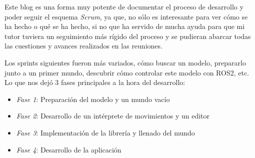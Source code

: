 Este blog es una forma muy potente de documentar el proceso de desarrollo y poder seguir el esquema \textit{Scrum}, ya que, no sólo es interesante para ver cómo se ha hecho o qué se ha hecho, si no que ha servido de mucha ayuda para que mi tutor tuviera un seguimiento más rígido del proceso y se pudieran abarcar todas las cuestiones y avances realizados en las reuniones.

Los sprints siguientes fueron más variados, cómo buscar un modelo, prepararlo junto a un primer mundo, descubrir cómo controlar este modelo con ROS2, etc. Lo que nos dejó 3 fases principales a la hora del desarrollo:

\begin{itemize}
    \item \textit{Fase 1}: Preparación del modelo y un mundo vacío
    \item \textit{Fase 2}: Desarrollo de un intérprete de movimientos y un editor
    \item \textit{Fase 3}: Implementación de la librería y llenado del mundo
    \item \textit{Fase 4}: Desarrollo de la aplicación
\end{itemize}